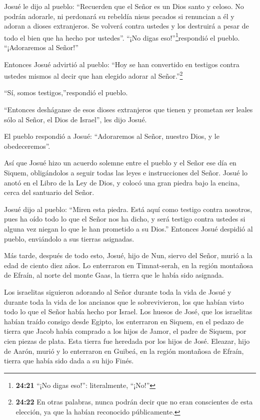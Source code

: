  Josué le dijo al pueblo: ``Recuerden que el Señor es un
Dios santo y celoso. No podrán adorarle, ni perdonará su rebeldía nisus
pecados  si renuncian a él y adoran a dioses extranjeros.
Se volverá contra ustedes y los destruirá a pesar de todo el bien que ha
hecho por ustedes''.  ``¡No digas
eso!''\footnote{\textbf{24:21} ``¡No digas eso!'': literalmente,
  ``¡No!''}respondió el pueblo. ``¡Adoraremos al Señor!''

 Entonces Josué advirtió al pueblo: ``Hoy se han convertido
en testigos contra ustedes mismos al decir que han elegido adorar al
Señor.''\footnote{\textbf{24:22} En otras palabras, nunca podrán decir
  que no eran conscientes de esta elección, ya que la habían reconocido
  públicamente.}

``Sí, somos testigos,''respondió el pueblo.

 ``Entonces desháganse de esos dioses extranjeros que
tienen y prometan ser leales sólo al Señor, el Dios de Israel'', les
dijo Josué.

 El pueblo respondió a Josué: ``Adoraremos al Señor,
nuestro Dios, y le obedeceremos''.

 Así que Josué hizo un acuerdo solemne entre el pueblo y el
Señor ese día en Siquem, obligándolos a seguir todas las leyes e
instrucciones del Señor.  Josué lo anotó en el Libro de la
Ley de Dios, y colocó una gran piedra bajo la encina, cerca del
santuario del Señor.

 Josué dijo al pueblo: ``Miren esta piedra. Está aquí como
testigo contra nosotros, pues ha oído todo lo que el Señor nos ha dicho,
y será testigo contra ustedes si alguna vez niegan lo que le han
prometido a su Dios.''  Entonces Josué despidió al pueblo,
enviándolo a sus tierras asignadas.

 Más tarde, después de todo esto, Josué, hijo de Nun,
siervo del Señor, murió a la edad de ciento diez años.  Lo
enterraron en Timnat-serah, en la región montañosa de Efraín, al norte
del monte Gaas, la tierra que le había sido asignada.

 Los israelitas siguieron adorando al Señor durante toda la
vida de Josué y durante toda la vida de los ancianos que le
sobrevivieron, los que habían visto todo lo que el Señor había hecho por
Israel.  Los huesos de José, que los israelitas habían
traído consigo desde Egipto, los enterraron en Siquem, en el pedazo de
tierra que Jacob había comprado a los hijos de Jamor, el padre de
Siquem, por cien piezas de plata. Esta tierra fue heredada por los hijos
de José.  Eleazar, hijo de Aarón, murió y lo enterraron en
Guibeá, en la región montañosa de Efraín, tierra que había sido dada a
su hijo Finés.
